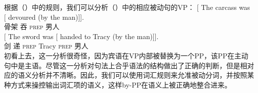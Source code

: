 根据（）中的规则，我们可以分析（）中的相应被动句的VP：
\eal
\ex
\gll {} [ The carcass was [ devoured (by the man)]].\\
{} {}  骨架 \passivepst{} {} 吞 \textsc{prep}  男人\\
\ex
\gll {} [ The sword was [ handed to Tracy (by the man)]].\\
{} {}  剑 \passivepst{} {} 递 \textsc{prep} Tracy \textsc{prep}  男人\\
\zl
%
初看上去，这一分析很奇怪，因为宾语在VP内部被替换为一个PP，该PP在主动句中是主语。尽管这一分析对句法上合乎语法的结构做出了正确的判断，但是相对应的语义分析并不清晰。因此，我们可以使用词汇规则来允准被动分词，并按照某种方式来操控输出词汇项的语义，这样by-PP在语义上被正确地整合进来\citep[]{GKPS85a}。

